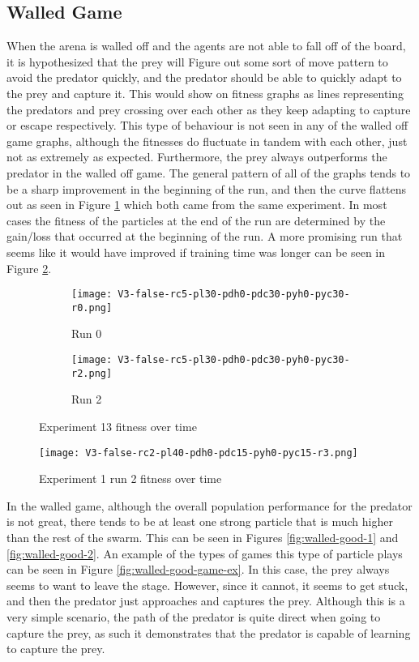 \subsection{Walled Game}

When the arena is walled off and the agents are not able to fall off of the board, it is hypothesized that the prey will Figure out some sort of move pattern to avoid the predator quickly, and the predator should be able to quickly adapt to the prey and capture it. This would show on fitness graphs as lines representing the predators and prey crossing over each other as they keep adapting to capture or escape respectively. This type of behaviour is not seen in any of the walled off game graphs, although the fitnesses do fluctuate in tandem with each other, just not as extremely as expected. Furthermore, the prey always outperforms the predator in the walled off game. The general pattern of all of the graphs tends to be a sharp improvement in the beginning of the run, and then the curve flattens out as seen in Figure \ref{fig:wall-exp-1} which both came from the same experiment. In most cases the fitness of the particles at the end of the run are determined by the gain/loss that occurred at the beginning of the run. A more promising run that seems like it would have improved if training time was longer can be seen in Figure \ref{fig:walled-better-run}. 

\begin{figure}
  \centering
  \begin{subfigure}{0.7\textwidth}
  \texttt{[image: V3-false-rc5-pl30-pdh0-pdc30-pyh0-pyc30-r0.png]}
  \caption{Run 0}
  \end{subfigure}
  \begin{subfigure}{0.7\textwidth}
    \texttt{[image: V3-false-rc5-pl30-pdh0-pdc30-pyh0-pyc30-r2.png]}
    \caption{Run 2}
    \end{subfigure}
  \caption{Experiment 13 fitness over time}
  \label{fig:wall-exp-1}
\end{figure}

\begin{figure}
  
   \centering
  \texttt{[image: V3-false-rc2-pl40-pdh0-pdc15-pyh0-pyc15-r3.png]}  
  \caption{Experiment 1 run 2 fitness over time}
  \label{fig:walled-better-run}
  
\end{figure}

In the walled game, although the overall population performance for the predator is not great, there tends to be at least one strong particle that is much higher than the rest of the swarm. This can be seen in Figures \ref{fig:walled-good-1} and \ref{fig:walled-good-2}. An example of the types of games this type of particle plays can be seen in Figure \ref{fig:walled-good-game-ex}. In this case, the prey always seems to want to leave the stage. However, since it cannot, it seems to get stuck, and then the predator just approaches and captures the prey. Although this is a very simple scenario, the path of the predator is quite direct when going to capture the prey, as such it demonstrates that the predator is capable of learning to capture the prey.


